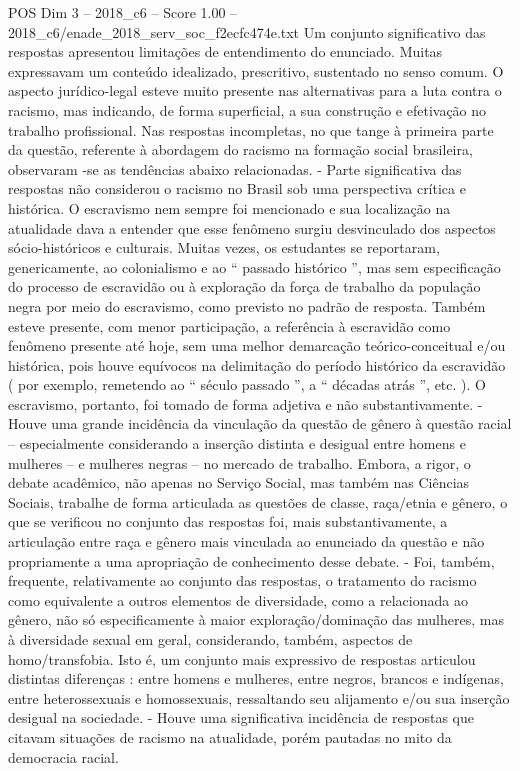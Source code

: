 \begin{textsample}{POS Dim 3 – 2018\_c6 – Score 1.00 – 2018\_c6/enade\_2018\_serv\_soc\_f2ecfc474e.txt}
Um conjunto significativo das respostas apresentou limitações de entendimento do enunciado.
Muitas expressavam um conteúdo idealizado, prescritivo, sustentado no senso comum.
O aspecto jurídico-legal esteve muito presente nas alternativas para a luta contra o racismo, mas indicando, de forma superficial, a sua construção e efetivação no trabalho profissional.
Nas respostas incompletas, no que tange à primeira parte da questão, referente à abordagem do racismo na formação social brasileira, observaram -se as tendências abaixo relacionadas. - Parte significativa das respostas não considerou o racismo no Brasil sob uma perspectiva crítica e histórica.
O escravismo nem sempre foi mencionado e sua localização na atualidade dava a entender que esse fenômeno surgiu desvinculado dos aspectos sócio-históricos e culturais.
Muitas vezes, os estudantes se reportaram, genericamente, ao colonialismo e ao “ passado histórico ”, mas sem especificação do processo de escravidão ou à exploração da força de trabalho da população negra por meio do escravismo, como previsto no padrão de resposta.
Também esteve presente, com menor participação, a referência à escravidão como fenômeno presente até hoje, sem uma melhor demarcação teórico-conceitual e/ou histórica, pois houve equívocos na delimitação do período histórico da escravidão ( por exemplo, remetendo ao “ século passado ”, a “ décadas atrás ”, etc. ).
O escravismo, portanto, foi tomado de forma adjetiva e não substantivamente. - Houve uma grande incidência da vinculação da questão de gênero à questão racial – especialmente considerando a inserção distinta e desigual entre homens e mulheres – e mulheres negras – no mercado de trabalho.
Embora, a rigor, o debate acadêmico, não apenas no Serviço Social, mas também nas Ciências Sociais, trabalhe de forma articulada as questões de classe, raça/etnia e gênero, o que se verificou no conjunto das respostas foi, mais substantivamente, a articulação entre raça e gênero mais vinculada ao enunciado da questão e não propriamente a uma apropriação de conhecimento desse debate. - Foi, também, frequente, relativamente ao conjunto das respostas, o tratamento do racismo como equivalente a outros elementos de diversidade, como a relacionada ao gênero, não só especificamente à maior exploração/dominação das mulheres, mas à diversidade sexual em geral, considerando, também, aspectos de homo/transfobia.
Isto é, um conjunto mais expressivo de respostas articulou distintas diferenças : entre homens e mulheres, entre negros, brancos e indígenas, entre heterossexuais e homossexuais, ressaltando seu alijamento e/ou sua inserção desigual na sociedade. - Houve uma significativa incidência de respostas que citavam situações de racismo na atualidade, porém pautadas no mito da democracia racial.

\end{textsample}

